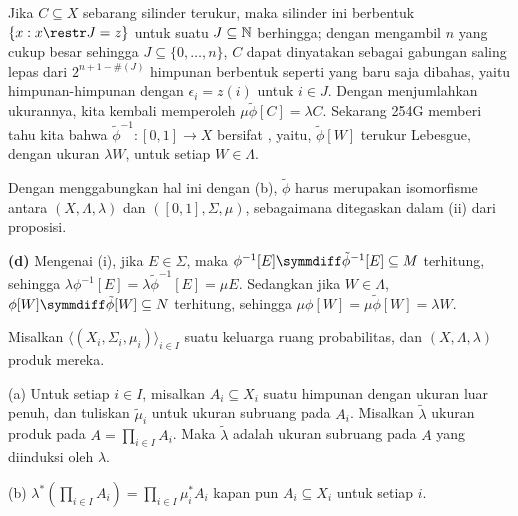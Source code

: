 {Jika $C\subseteq X$ sebarang silinder terukur, maka silinder ini berbentuk
$\{x:x\restr J=z\}$ untuk suatu $J\subseteq\Bbb N$ berhingga; dengan mengambil $n$ yang
cukup besar sehingga $J\subseteq\{0,\ldots,n\}$, $C$ dapat dinyatakan sebagai gabungan
saling lepas dari $2^{n+1-\#(J)}$ himpunan berbentuk seperti yang baru saja dibahas, yaitu
himpunan-himpunan dengan $\epsilon_i=z(i)$ untuk $i\in J$. Dengan menjumlahkan ukurannya,
kita kembali memperoleh $\mu\tilde\phi[C]=\lambda C$. Sekarang 254G memberi tahu kita bahwa
$\tilde\phi^{-1}:[0,1]\to X$ bersifat \imp, yaitu, $\tilde\phi[W]$
terukur Lebesgue, dengan ukuran $\lambda W$, untuk setiap $W\in\Lambda$.

Dengan menggabungkan hal ini dengan (b), $\tilde\phi$ harus merupakan isomorfisme
antara $(X,\Lambda,\lambda)$ dan $([0,1],\Sigma,\mu)$, sebagaimana ditegaskan dalam
(ii) dari proposisi.

\medskip

{\bf (d)} Mengenai (i), jika $E\in\Sigma$, maka
$\phi^{-1}[E]\symmdiff\tilde\phi^{-1}[E]\subseteq M$ terhitung, sehingga
$\lambda\phi^{-1}[E]=\lambda\tilde\phi^{-1}[E]=\mu E$. Sedangkan jika
$W\in\Lambda$, $\phi[W]\symmdiff\tilde\phi[W]\subseteq N$ terhitung,
sehingga $\mu\phi[W]=\mu\tilde\phi[W]=\lambda W$.
}%

 Misalkan
$\langle(X_i,\Sigma_i,\mu_i)\rangle_{i\in I}$
suatu keluarga ruang probabilitas, dan $(X,\Lambda,\lambda)$ produk
mereka.

(a) Untuk setiap $i\in I$, misalkan $A_i\subseteq X_i$ suatu himpunan dengan
ukuran luar penuh, dan tuliskan $\tilde\mu_i$ untuk ukuran subruang pada
$A_i$.
Misalkan $\tilde\lambda$ ukuran produk pada $A=\prod_{i\in I}A_i$.
Maka $\tilde\lambda$ adalah ukuran subruang pada $A$ yang diinduksi oleh
$\lambda$.

(b) $\lambda^*(\prod_{i\in I}A_i)=\prod_{i\in I}\mu_i^*A_i$ kapan pun
$A_i\subseteq X_i$ untuk setiap $i$.

